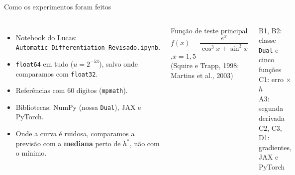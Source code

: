 \documentclass[aspectratio=169,11pt]{beamer}
\begin{document}
\begin{frame}{Como os experimentos foram feitos}
  \begin{columns}[T]
    \begin{itemize}
      \item Notebook do Lucas: \texttt{Automatic\_Differentiation\_\allowbreak Revisado.ipynb}.
      \item \texttt{float64} em tudo ($u=2^{-53}$), salvo onde comparamos com \texttt{float32}.
      \item Referências com 60 dígitos (\texttt{mpmath}).
      \item Bibliotecas: NumPy (nossa \texttt{Dual}), JAX e PyTorch.
      \item Onde a curva é ruidosa, comparamos a previsão com a \textbf{mediana} perto de $h^\ast$, não com o mínimo.
    \end{itemize}
    \begin{exampleblock}{Função de teste principal}
      \centering $f(x) = \dfrac{e^x}{\cos^3x+\sin^3x}$,\qquad $x = 1{,}5$\\[0.3em]
      {\small (Squire e Trapp, 1998; Martins et al., 2003)}
    \end{exampleblock}
    \vspace{0.3em}
    {\small B1, B2: classe \texttt{Dual} e cinco funções \\ C1: erro $\times$ $h$ \\ A3: segunda derivada \\ C2, C3, D1: gradientes, JAX e PyTorch}
  \end{columns}
\end{frame}
\end{document}
